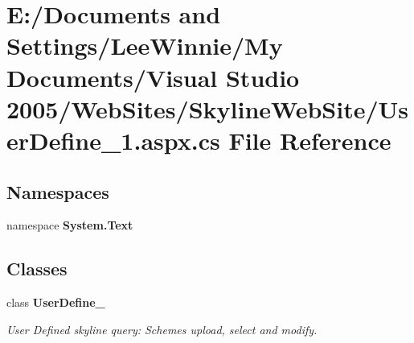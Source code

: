 \section{E:/Documents and Settings/Lee\-Winnie/My Documents/Visual Studio 2005/Web\-Sites/Skyline\-Web\-Site/User\-Define\_\-1.aspx.cs File Reference}
\label{_user_define__1_8aspx_8cs}
\subsection*{Namespaces}
\begin{CompactItemize}
\item 
namespace {\bf System.Text}
\end{CompactItemize}
\subsection*{Classes}
\begin{CompactItemize}
\item 
class {\bf User\-Define\_}
\begin{CompactList}\small\item\em User Defined skyline query: Schemes upload, select and modify. \item\end{CompactList}\end{CompactItemize}
